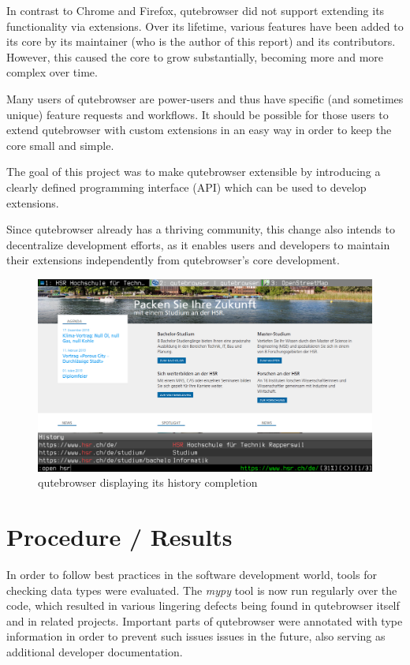 In contrast to Chrome and Firefox, qutebrowser did not support extending its
functionality via extensions. Over its lifetime, various features have been
added to its core by its maintainer (who is the author of this report) and its
contributors. However, this caused the core to grow substantially, becoming more
and more complex over time.

Many users of qutebrowser are power-users and thus have specific (and sometimes
unique) feature requests and workflows. It should be possible for those users to
extend qutebrowser with custom extensions in an easy way in order to keep the
core small and simple.

The goal of this project was to make qutebrowser extensible by introducing a
clearly defined programming interface (API) which can be used to develop
extensions.

Since qutebrowser already has a thriving community, this change also intends to
decentralize development efforts, as it enables users and developers to maintain
their extensions independently from qutebrowser's core development.

\begin{figure}[H]
\includegraphics[width=\linewidth]{img/screenshot-intro.png}
\caption{qutebrowser displaying its history completion}
\end{figure}

\section*{Procedure / Results}
In order to follow best practices in the software development world,
tools for checking data types were evaluated. The \emph{mypy} tool is now run
regularly over the code, which resulted in various lingering defects
being found in qutebrowser itself and in related projects. Important parts of
qutebrowser were annotated with type information in order to prevent such issues
issues in the future, also serving as additional developer documentation.

